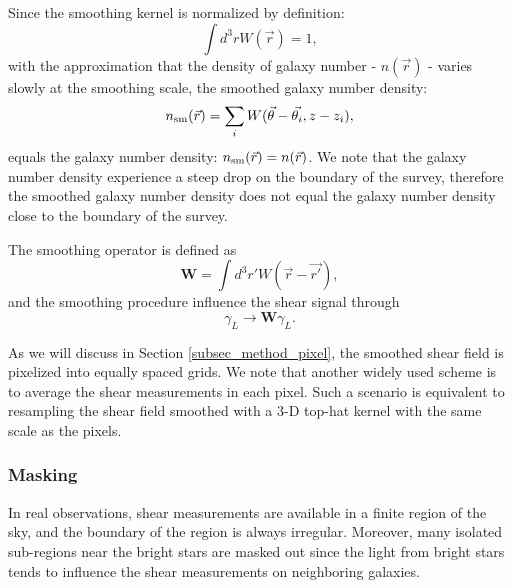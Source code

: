 \documentclass[twocolumn]{aastex62}
\begin{document}
Since the smoothing kernel is normalized by definition:
\begin{equation}
\int d^3r W(\vec{r})=1,
\end{equation}
with the approximation that the density of galaxy number - $n(\vec{r})$ -
varies slowly at the smoothing scale, the
smoothed galaxy number density:
\begin{equation}\label{eq-numDesSmooth}
n_{\rm{sm}}(\vec{r})=\sum_i W(\vec{\theta}-\vec{\theta_i},z-z_i),
\end{equation}
equals the galaxy number density: $n_{\rm{sm}}(\vec{r})=n(\vec{r})$.
We note that the galaxy number density experience a steep drop on the boundary
of the survey, therefore the smoothed galaxy number density does not equal the
galaxy number density close to the boundary of the survey.

The smoothing operator is defined as
\begin{equation}
\mathbf{W} = \int d^3 r' W(\vec{r}-\vec{r'}),
\end{equation}
and the smoothing procedure influence the shear signal through
\begin{equation}
\gamma_L \rightarrow \mathbf{W} \gamma_L.
\end{equation}

As we will discuss in Section \ref{subsec_method_pixel}, the smoothed shear
field is pixelized into equally spaced grids. We note that another widely used
scheme is to average the shear measurements in each pixel.  Such a scenario is
equivalent to resampling the shear field smoothed with a $3$-D top-hat kernel
with the same scale as the pixels.

\subsubsection{Masking}
\label{subsec_method_msknoise}

In real observations, shear measurements are available in a finite region of
the sky, and the boundary of the region is always irregular. Moreover, many
isolated sub-regions near the bright stars are masked out since the light from
bright stars tends to influence the shear measurements on neighboring galaxies.
\end{document}
